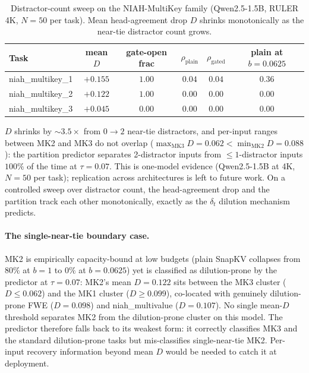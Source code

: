 \documentclass{article}
\begin{document}
\begin{table}[t]
\centering
\caption{Distractor-count sweep on the NIAH-MultiKey family
(Qwen2.5-1.5B, RULER 4K, $N = 50$ per task). Mean head-agreement drop
$D$ shrinks monotonically as the near-tie distractor count grows.}
\label{tab:distractor}
\begin{tabular}{lccccc}
\toprule
Task & mean $D$ & gate-open frac & $\rho_{\mathrm{plain}}$ & $\rho_{\mathrm{gated}}$ & plain at $b{=}0.0625$ \\
\midrule
niah\_multikey\_1 & $+0.155$ & $1.00$ & $0.04$ & $0.04$ & $0.36$ \\
niah\_multikey\_2 & $+0.122$ & $1.00$ & $0.00$ & $0.00$ & $0.00$ \\
niah\_multikey\_3 & $+0.045$ & $0.00$ & $0.00$ & $0.00$ & $0.00$ \\
\bottomrule
\end{tabular}
\end{table}

$D$ shrinks by $\sim 3.5\times$ from $0 \to 2$ near-tie distractors,
and per-input ranges between MK2 and MK3 do not overlap
($\max_{\text{MK3}} D = 0.062 < \min_{\text{MK2}} D = 0.088$): the
partition predictor separates 2-distractor inputs from
$\leq 1$-distractor inputs $100\%$ of the time at $\tau = 0.07$. This
is one-model evidence (Qwen2.5-1.5B at 4K, $N = 50$ per task);
replication across architectures is left to future work. On a
controlled sweep over distractor count, the head-agreement drop and
the partition track each other monotonically, exactly as the
$\delta_t$ dilution mechanism predicts.

\paragraph{The single-near-tie boundary case.} MK2 is empirically
capacity-bound at low budgets (plain SnapKV collapses from $80\%$ at
$b{=}1$ to $0\%$ at $b{=}0.0625$) yet is classified as dilution-prone
by the predictor at $\tau = 0.07$: MK2's mean $D = 0.122$ sits between
the MK3 cluster ($D \leq 0.062$) and the MK1 cluster ($D \geq 0.099$),
co-located with genuinely dilution-prone FWE ($D = 0.098$) and
niah\_multivalue ($D = 0.107$). No single mean-$D$ threshold separates
MK2 from the dilution-prone cluster on this model. The predictor
therefore falls back to its weakest form: it correctly classifies MK3
and the standard dilution-prone tasks but mis-classifies single-near-tie
MK2. Per-input recovery information beyond mean $D$ would be needed to
catch it at deployment.
\end{document}

